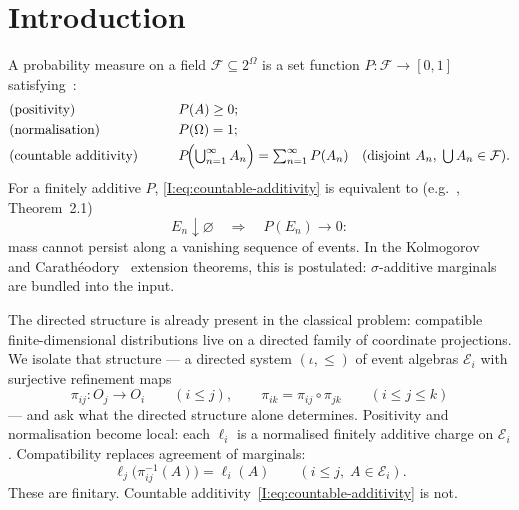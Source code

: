 \section{Introduction}
\label{I:sec:intro}

A probability measure on a field $\mathcal{F}\subseteq 2^\Omega$ is a
set function $P : \mathcal{F} \to [0,1]$
satisfying~\cite{Billingsley, Kolmogorov}:
\begin{alignat}{2}
  &\text{(positivity)}    &\qquad& P(A) \geq 0;
    \label{I:eq:positivity} \\
  &\text{(normalisation)} &\qquad& P(\Omega) = 1;
    \label{I:eq:normalisation} \\
  &\text{(countable additivity)} &\qquad&
    P\!\Bigl(\textstyle\bigcup_{n=1}^{\infty} A_n\Bigr)
    = \textstyle\sum_{n=1}^{\infty} P(A_n)
    \quad (\text{disjoint } A_n,\;
           \textstyle\bigcup A_n \in \mathcal{F}).
    \label{I:eq:countable-additivity}
\end{alignat}
For a finitely additive $P$,
\eqref{I:eq:countable-additivity} is equivalent to
(e.g.~\cite{Billingsley}, Theorem~2.1)
\begin{equation}\label{I:eq:continuity-at-empty}
  E_n \downarrow \varnothing
  \quad\Longrightarrow\quad
  P(E_n) \to 0:
\end{equation}
mass cannot persist along a vanishing sequence of events.
In the Kolmogorov~\cite{Kolmogorov} and
Carath\'{e}odory~\cite{Bogachev} extension theorems, this is
postulated: $\sigma$-additive marginals are
bundled into the input.

The directed structure is already present in the classical problem:
compatible finite-dimensional distributions live on a directed family of
coordinate projections.  We isolate that structure --- a directed
system $(\iota, \leq)$ of event algebras $\mathcal{E}_i$ with surjective
refinement maps
\[
  \pi_{ij} : O_j \to O_i
  \qquad (i \leq j),
  \qquad
  \pi_{ik} = \pi_{ij} \circ \pi_{jk}
  \qquad (i \leq j \leq k)
\]
--- and ask what the directed structure alone determines.
Positivity and normalisation become local: each $\ell_i$ is a normalised
finitely additive charge on $\mathcal{E}_i$.  Compatibility replaces
agreement of marginals:
\begin{equation}\label{I:eq:compatibility}
  \ell_j\!\bigl(\pi_{ij}^{-1}(A)\bigr) = \ell_i(A)
  \qquad (i \leq j,\; A \in \mathcal{E}_i).
\end{equation}
These are finitary.
Countable additivity~\eqref{I:eq:countable-additivity} is not.

